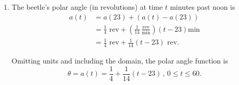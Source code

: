 \documentclass{ximera}
\begin{document}
\begin{example}
\begin{explanation}
\begin{enumerate}
So the beetle's polar angle at 12:51pm is
\begin{align*}
   a(51) &= a(23) + (a(51) - a(23))\\
           &=\frac{1}{4} \text{ rev} + \left(  \frac{1}{14} \, \frac{\text{rev}}{\text{min}} \right) \left( 51-23 \right) \text{min}  \\
            &=\frac{1}{4} \text{ rev} + \left(  \frac{1}{14} \, \frac{\text{rev}}{\text{min}} \right) \left( 28 \text{ min} \right)  \\
            &= \frac{1}{4} \text{ rev} + 2 \text{ rev} \\
            &= 2.25 \text{ rev}.
\end{align*}

\item The beetle's polar angle (in revolutions) at time $t$ minutes past noon is
\begin{align*}
  a(t) &= a(23) + (a(t) - a(23))\\
           &=\frac{1}{4} \text{ rev} + \left(  \frac{1}{14} \, \frac{\text{rev}}{\text{min}} \right) \left( t-23 \right) \text{min}  \\
            &=\frac{1}{4} \text{ rev} +  \frac{1}{14}  \left( t-23\right) \text{ rev} .
           \end{align*}

Omitting units and including the domain, the polar angle function is
\[
  \theta = a(t) = \frac{1}{4} + \frac{1}{14}  \left( t-23\right) \, , \, 0\leq t\leq 60.
\]
\end{enumerate}

\end{explanation}

\end{example}
\end{document}
